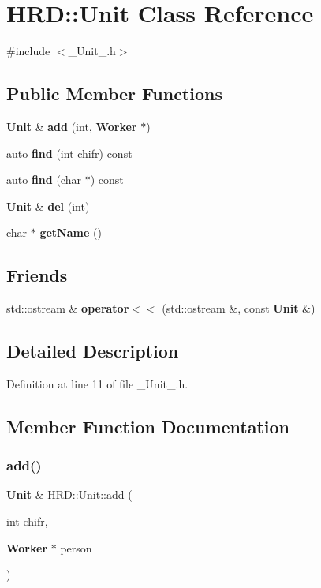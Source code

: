 \section{H\+RD\+:\+:Unit Class Reference}
\label{class_h_r_d_1_1_unit}


{\ttfamily \#include $<$\+\_\+\+Unit\+\_\+.\+h$>$}

\subsection*{Public Member Functions}
\begin{DoxyCompactItemize}
\item 
\textbf{ Unit} \& \textbf{ add} (int, \textbf{ Worker} $\ast$)
\item 
auto \textbf{ find} (int chifr) const
\item 
auto \textbf{ find} (char $\ast$) const
\item 
\textbf{ Unit} \& \textbf{ del} (int)
\item 
char $\ast$ \textbf{ get\+Name} ()
\end{DoxyCompactItemize}
\subsection*{Friends}
\begin{DoxyCompactItemize}
\item 
std\+::ostream \& \textbf{ operator$<$$<$} (std\+::ostream \&, const \textbf{ Unit} \&)
\end{DoxyCompactItemize}


\subsection{Detailed Description}


Definition at line 11 of file \+\_\+\+Unit\+\_\+.\+h.



\subsection{Member Function Documentation}
\mbox{\label{class_h_r_d_1_1_unit_a2ebd571aada586d1a05507962ea0c7b0}} 
\subsubsection{add()}
{\footnotesize\ttfamily \textbf{ Unit} \& H\+R\+D\+::\+Unit\+::add (\begin{DoxyParamCaption}\item[{int}]{chifr,  }\item[{\textbf{ Worker} $\ast$}]{person }\end{DoxyParamCaption})}



